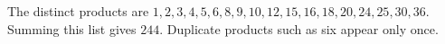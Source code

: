 The distinct products are $1,2,3,4,5,6,8,9,10,12,15,16,18,20,24,25,30,36$. Summing this list gives $\boxed{244}$. Duplicate products such as six appear only once.
